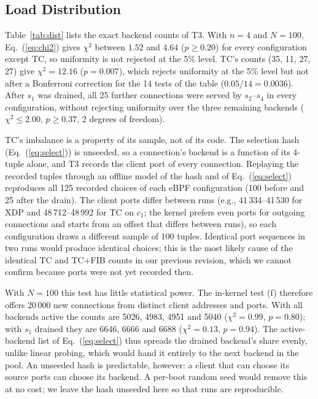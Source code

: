 \documentclass[conference]{IEEEtran}
\begin{document}
\subsection{Load Distribution}
Table~\ref{tab:dist} lists the exact backend counts of T3. With $n=4$ and
$N=100$, Eq.~(\ref{eq:chi2}) gives $\chi^2$ between $1.52$ and $4.64$
($p \ge 0.20$) for every configuration except TC, so uniformity is not
rejected at the 5\% level. TC's counts (35, 11, 27, 27) give $\chi^2=12.16$
($p=0.007$), which rejects uniformity at the 5\% level but not after a
Bonferroni correction for the 14 tests of the table ($0.05/14=0.0036$).
After $s_1$ was drained, all 25 further connections were served by
$s_2$--$s_4$ in every configuration, without rejecting uniformity over the
three remaining backends ($\chi^2 \le 2.00$, $p \ge 0.37$, 2 degrees of
freedom).

TC's imbalance is a property of its sample, not of its code. The selection
hash (Eq.~(\ref{eq:select})) is unseeded, so a connection's backend is a
function of its 4-tuple alone, and T3 records the client port of every
connection. Replaying the recorded tuples through an offline model of the
hash and of Eq.~(\ref{eq:select}) reproduces all 125 recorded choices of
each eBPF configuration (100 before and 25 after the drain). The client ports
differ between runs (e.g., 41\,334--41\,530 for XDP and 48\,712--48\,992 for TC
on $c_1$; the kernel prefers even ports for outgoing connections and starts
from an offset that differs between runs), so each configuration draws a
different sample of 100 tuples. Identical port sequences in two runs would
produce identical choices; this is the most likely cause of the identical TC
and TC+FIB counts in our previous revision, which we cannot confirm because
ports were not yet recorded then.

With $N=100$ this test has little statistical power. The in-kernel test (f)
therefore offers 20\,000 new connections from distinct client addresses and
ports. With all backends active the counts are 5026, 4983, 4951 and 5040
($\chi^2=0.99$, $p=0.80$); with $s_1$ drained they are 6646, 6666 and 6688
($\chi^2=0.13$, $p=0.94$). The active-backend list of
Eq.~(\ref{eq:select}) thus spreads the drained backend's share evenly, unlike
linear probing, which would hand it entirely to the next backend in the pool.
An unseeded hash is predictable, however: a client that can choose its source
ports can choose its backend. A per-boot random seed would remove this at no
cost; we leave the hash unseeded here so that runs are reproducible.
\end{document}
